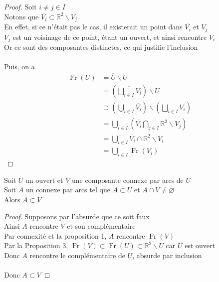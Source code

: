 \documentclass{article}
\begin{document}
\begin{flushleft}
\begin{proof}
    Soit $i \neq j \in I$\\
    Notons que $\overline{V_i} \subset \mathbb{R}^2 \backslash V_j$\\
    En effet, si ce n'était pas le cas, il existerait un point dans $\overline{V_i}$ et $V_j$\\
    $V_j$ est un voisinage de ce point, étant un ouvert, et ainsi rencontre $V_i$\\
    Or ce sont des composantes distinctes, ce qui justifie l'inclusion
    \\~\\
    Puis, on a
    \begin{align*}
        \operatorname{Fr}(U) &= \overline{U} \backslash U\\
        &= \left( \overline{\bigsqcup_{i \in I} V_i} \right) \backslash U\\
        &\supset \left( \bigcup_{i \in I} \overline{V_i} \right) \backslash \left( \bigsqcup_{i \in I} V_i \right)\\
        &= \bigcup_{i \in I} \left( \overline{V_i} \bigcap_{j \in I} \mathbb{R}^2 \backslash V_j \right)\\
        &= \bigcup_{i \in I} \overline{V_i} \cap \mathbb{R}^2 \backslash V_i\\
        &= \bigcup_{i \in I} \operatorname{Fr}(V_i)
    \end{align*}
\end{proof}

\begin{tcolorbox}[colback = purple!20!white, colframe = purple!60!white, title = Proposition 4]
    Soit $U$ un ouvert et $V$ une composante connexe par arcs de $U$\\
    Soit $A$ un connexe par arcs tel que $A \subset U$ et $A \cap V \neq \varnothing$\\
    Alors $A \subset V$
\end{tcolorbox}

\begin{proof}
    Supposons par l'absurde que ce soit faux\\
    Ainsi $A$ rencontre $V$ et son complémentaire\\
    Par connexité et la proposition 1, $A$ rencontre $\operatorname{Fr}(V)$\\
    Par la Proposition 3, $\operatorname{Fr}(V) \subset \operatorname{Fr}(U) \subset \mathbb{R}^2 \backslash U$ car $U$ est ouvert\\
    Donc $A$ rencontre le complémentaire de $U$, absurde par inclusion
    \\~\\
    Donc $A \subset V$
\end{proof}


\end{flushleft}
\end{document}

